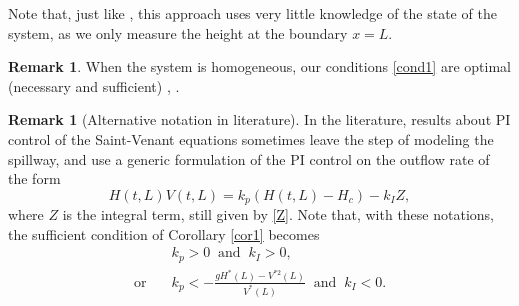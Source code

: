 \documentclass[11pt]{article}
\numberwithin{equation}{section}
\theoremstyle{definition}
\newtheorem{rmk}[thm]{Remark}
\begin{document}
{Note that, just like \cite{BastinCoronPI}, this approach uses very little knowledge of the state of the system, as we only measure the height at the boundary $x=L$.}

\begin{rmk}
{When the system is homogeneous, our conditions \eqref{cond1} are optimal (necessary and sufficient) \cite{BastinCoronTamasoiu2015}, \cite[\S 2.2.4.1]{BastinCoron1D}.}
\end{rmk}

\begin{rmk}[Alternative notation in literature]
In the literature, results about PI control of the Saint-Venant equations sometimes leave the step of modeling the spillway, and use a generic formulation of the PI control on the outflow rate of the form\vspace*{-3pt}
\begin{equation*}
H(t,L)V(t,L)=k_{{p}}(H(t,L)-H_{c})-k_{{I}}Z,
\end{equation*}
where $Z$ is the integral term, still given by \eqref{Z}.
Note that, with these notations, the sufficient condition of Corollary \ref{cor1} becomes\vspace*{-3pt}
\begin{equation*}
\begin{split}
&k_{p}>0\;\;\text{and}\;\;k_{I}>0,\\
\text{or}\quad&k_{p}<-\frac{gH^{*}(L)-V^{*2}(L)}{V^{*}(L)}\;\;\text{and}\;\;k_{I}<0.
\end{split}
\end{equation*}
\end{rmk}
\end{document}
